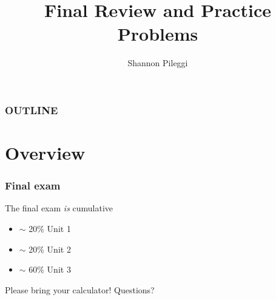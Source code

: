 





\title[Unit 3 Deck 4]{Final Review and Practice Problems}
\author[Pileggi]{Shannon Pileggi}


\date{}




\begin{frame}
\titlepage
\end{frame}

\begin{frame}
\frametitle{OUTLINE\qquad\qquad\qquad} \tableofcontents[hideallsubsections]
\end{frame}


\section[Overview]{Overview}


\begin{frame}
\frametitle{Final exam}
The final exam \emph{is} cumulative
    \begin{itemize}
    \item
    $\sim$ 20\% Unit 1
    \item
    $\sim$ 20\% Unit 2
    \item
    $\sim$ 60\% Unit 3
    \end{itemize}
    \vskip20pt
    Please bring your calculator! Questions?
\end{frame}




